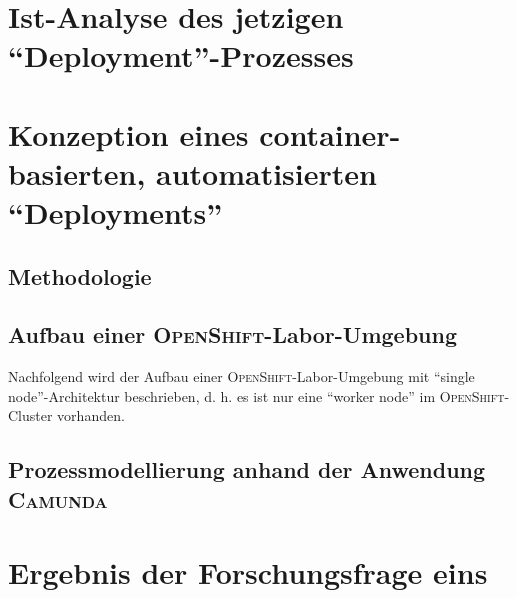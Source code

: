 \section{Ist-Analyse des jetzigen \enquote{Deployment}-Prozesses}


\section{Konzeption eines container-basierten, automatisierten \enquote{Deployments}}
\subsection{Methodologie}

\subsection{Aufbau einer \textsc{OpenShift}-Labor-Umgebung}
Nachfolgend wird der Aufbau einer \textsc{OpenShift}-Labor-Umgebung mit \enquote{single node}-Architektur beschrieben, d. h. es ist nur eine \enquote{worker node} im \textsc{OpenShift}-Cluster vorhanden.

\subsection{Prozessmodellierung anhand der Anwendung \textsc{Camunda}}
\section{Ergebnis der Forschungsfrage eins}
